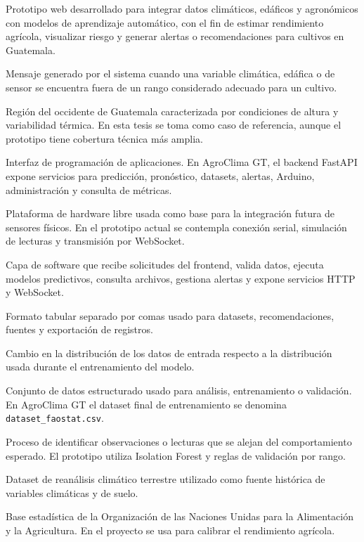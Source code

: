 \documentclass[12pt,letterpaper,oneside]{report}
\newcommand{\codigo}[1]{\texttt{#1}}
\begin{document}
\begin{description}[leftmargin=4cm,style=nextline]
\item[AgroClima GT.] Prototipo web desarrollado para integrar datos climáticos, edáficos y agronómicos con modelos de aprendizaje automático, con el fin de estimar rendimiento agrícola, visualizar riesgo y generar alertas o recomendaciones para cultivos en Guatemala.
\item[Alerta agroclimática.] Mensaje generado por el sistema cuando una variable climática, edáfica o de sensor se encuentra fuera de un rango considerado adecuado para un cultivo.
\item[Altiplano Occidental.] Región del occidente de Guatemala caracterizada por condiciones de altura y variabilidad térmica. En esta tesis se toma como caso de referencia, aunque el prototipo tiene cobertura técnica más amplia.
\item[API.] Interfaz de programación de aplicaciones. En AgroClima GT, el backend FastAPI expone servicios para predicción, pronóstico, datasets, alertas, Arduino, administración y consulta de métricas.
\item[Arduino.] Plataforma de hardware libre usada como base para la integración futura de sensores físicos. En el prototipo actual se contempla conexión serial, simulación de lecturas y transmisión por WebSocket.
\item[Backend.] Capa de software que recibe solicitudes del frontend, valida datos, ejecuta modelos predictivos, consulta archivos, gestiona alertas y expone servicios HTTP y WebSocket.
\item[CSV.] Formato tabular separado por comas usado para datasets, recomendaciones, fuentes y exportación de registros.
\item[Data drift.] Cambio en la distribución de los datos de entrada respecto a la distribución usada durante el entrenamiento del modelo.
\item[Dataset.] Conjunto de datos estructurado usado para análisis, entrenamiento o validación. En AgroClima GT el dataset final de entrenamiento se denomina \codigo{dataset\_faostat.csv}.
\item[Detección de anomalías.] Proceso de identificar observaciones o lecturas que se alejan del comportamiento esperado. El prototipo utiliza Isolation Forest y reglas de validación por rango.
\item[ERA5-Land.] Dataset de reanálisis climático terrestre utilizado como fuente histórica de variables climáticas y de suelo.
\item[FAOSTAT.] Base estadística de la Organización de las Naciones Unidas para la Alimentación y la Agricultura. En el proyecto se usa para calibrar el rendimiento agrícola.

\end{description}
\end{document}
